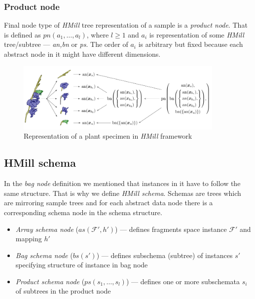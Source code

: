 \subsubsection{Product node}
Final node type of \emph{HMill} tree representation of a sample is a \emph{product node}. That is defined as $pn(a_1,\dots,a_{l})$, where $l\geq1$ and $a_i$ is representation of some \emph{HMill} tree/subtree --- \emph{an,bn} or \emph{ps}. The order of $a_i$ is arbitrary but fixed because each abstract node in it might have different dimensions.

\begin{figure}[h]
    \centering
    \includegraphics[width=0.9\textwidth]{figures/irismill.png}
    \caption{Representation of a plant specimen in \emph{HMill} framework \cite{Mandlik2020}}
    \label{fig:irismill}
\end{figure}

\subsection{HMill schema}
In the \emph{bag node} definition we mentioned that instances in it have to follow the same structure. That is why we define \emph{HMill schema}. Schemas are trees which are mirroring sample trees and for each abstract data node there is a corresponding schema node in the schema structure. 
\begin{itemize}
    \itemsep0em 
    \item \emph{Array schema node} ($as(\mathcal{F'},h')$) --- defines fragments space instance $\mathcal{F'}$ and mapping $h'$
    \item \emph{Bag schema node} ($bs(s')$) --- defines subschema (subtree) of instances $s'$ specifying structure of instance in bag node
    \item \emph{Product schema node} ($ps(s_1,\dots,s_{l})$) --- defines one or more subschemata $s_i$ of subtrees in the product node
\end{itemize}

